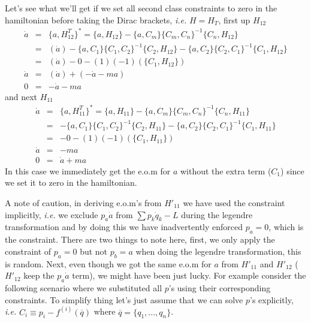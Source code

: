 \documentclass[aps,preprint,preprintnumbers,nofootinbib,showpacs,prd]{revtex4-1}
\newcommand{\ie}{{\it i.e.} }
\newcommand{\nbea}{\begin{eqnarray*}}
\newcommand{\neea}{\end{eqnarray*}}
\begin{document}
Let's see what we'll get if we set all second class constraints to zero in the hamiltonian before taking the Dirac brackets, \ie $H = H_T$, first up $H_{12}$
%
\nbea
\dot a & = & \{a, H^T_{12}\}^* = \{a, H_{12}\} - \{a, C_m\}\{C_m, C_n\}^{-1}\{C_n, H_{12}\} \\
& = & (\dot a) - \{a, C_1\}\{C_1, C_2\}^{-1}\{C_2, H_{12}\} - \{a, C_2\}\{C_2, C_1\}^{-1}\{C_1, H_{12}\} \\
& = & (\dot a) - 0 - (1)(-1) (\{C_1, H_{12}\} )\\
\dot a & = & (\dot a) + (-\dot a -ma ) \\
0 & = & -\dot a - ma
\neea
%
and next $H_{11}$
%
\nbea
\dot a & = & \{a, H^T_{11}\}^* = \{a, H_{11}\} - \{a, C_m\}\{C_m, C_n\}^{-1}\{C_n, H_{11}\} \\
& = & - \{a, C_1\}\{C_1, C_2\}^{-1}\{C_2, H_{11}\} - \{a, C_2\}\{C_2, C_1\}^{-1}\{C_1, H_{11}\} \\
& = & - 0 - (1)(-1) (\{C_1, H_{11}\})\\
\dot a & = & -ma \\
0 & = & \dot a + ma
\neea
%
In this case we immediately get the e.o.m for $a$ without the extra term ($C_1$) since we set it to zero in the hamiltonian.

A note of caution, in deriving e.o.m's from $H'_{11}$ we have used the constraint implicitly, \ie we exclude $p_a \dot a$ from $\sum p_k \dot q_k - L$ during the legendre transformation and by doing this we have inadvertently enforced $p_a=0$, which is the constraint. There are two things to note here, first, we only apply the constraint of $p_a = 0$ but not $p_b = a$ when doing the legendre transformation, this is random. Next, even though we got the same e.o.m for $a$ from $H'_{11}$ and $H'_{12}$ ($H'_{12}$ keep the $p_a \dot a$ term), we might have been just lucky. For example consider the following scenario where we substituted all $p$'s using their corresponding constraints. To simplify thing let's just assume that we can solve $p$'s explicitly, \ie $C_i \equiv p_i - f^{(i)}(\overline q)$ where $\overline q = \{q_1, ...,  q_n\}$.
\end{document}
